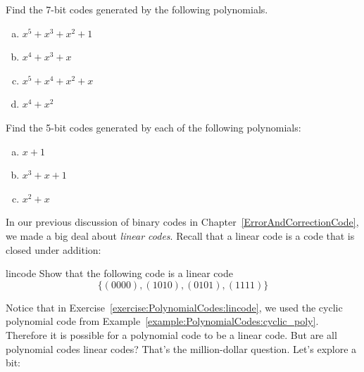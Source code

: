 \begin{exercise}{}
Find the 7-bit codes generated by the following polynomials.
\begin{enumerate}[(a)]
\item $x^5 + x^3 + x^2 + 1$
\item $x^4 + x^3 + x$
\item $x^5 + x^4 + x^2 + x$
\item $x^4 + x^2$
\end {enumerate}
\end {exercise}
%

\begin{exercise}{}
Find the 5-bit codes generated by each of the following polynomials: 
\begin{enumerate}[(a)]
\item $x + 1$
\item $x^3+x+1$
\item $x^2 + x$
\end{enumerate}
\end {exercise}


In our previous discussion of binary codes in Chapter~\ref{ErrorAndCorrectionCode}, we made a big deal about \emph{linear codes}.  Recall that a linear code is a code that is closed under addition:  

\begin{exercise}{lincode}
Show that the following code is a linear code
\[\{(0000),(1010),(0101),(1111)\}\]
\end {exercise}

Notice that in Exercise~\ref{exercise:PolynomialCodes:lincode}, we used the cyclic polynomial code from Example~\ref{example:PolynomialCodes:cyclic_poly}.  Therefore it is possible for a polynomial code to be a linear code.  But are all polynomial codes linear codes? That's the million-dollar question. Let's explore a bit:


